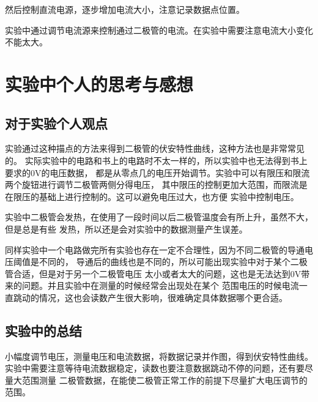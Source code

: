 \documentclass{ctexart}
\begin{document}
  然后控制直流电源，逐步增加电流大小，注意记录数据点位置。

  实验中通过调节电流源来控制通过二极管的电流。在实验中需要注意电流大小变化不能太大。

\section{实验中个人的思考与感想}
  \subsection{对于实验个人观点}
  实验通过这种描点的方法来得到二极管的伏安特性曲线，这种方法也是非常常见的。
  实际实验中的电路和书上的电路时不太一样的，所以实验中也无法得到书上要求的0V的电压数据，
  都是从零点几的电压开始调节。实验中可以有限压和限流两个旋钮进行调节二极管两侧分得电压，
  其中限压的控制更加大范围，而限流是在限压的基础上进行控制的。这可以避免电压过大，也方便
  实验中控制电压。

  实验中二极管会发热，在使用了一段时间以后二极管温度会有所上升，虽然不大，但是总是有些
  发热，所以还是会对实验中的数据测量产生误差。

  同样实验中一个电路做完所有实验也存在一定不合理性，因为不同二极管的导通电压阈值是不同的，
  导通后的曲线也是不同的，所以可能出现实验中对于某个二极管合适，但是对于另一个二极管电压
  太小或者太大的问题，这也是无法达到0V带来的问题。并且实验中在测量的时候经常会出现处在某个
  范围电压的时候电流一直跳动的情况，这也会读数产生很大影响，很难确定具体数据哪个更合适。
  \subsection{实验中的总结}
  小幅度调节电压，测量电压和电流数据，将数据记录并作图，得到伏安特性曲线。
  实验中需要注意等待电流数据稳定，读数也要注意数据跳动不停的问题，还有要尽量大范围测量
  二极管数据，在能使二极管正常工作的前提下尽量扩大电压调节的范围。
\end{document}
